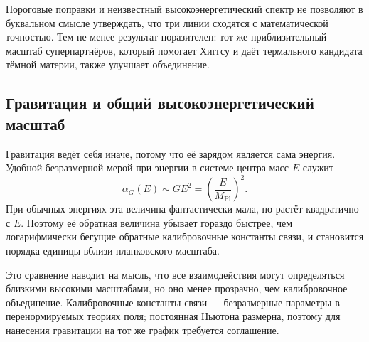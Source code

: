 \begin{classroomqa}
\end{classroomqa}

Пороговые поправки и неизвестный высокоэнергетический спектр не позволяют в буквальном смысле утверждать, что три линии сходятся с математической точностью. Тем не менее результат поразителен: тот же приблизительный масштаб суперпартнёров, который помогает Хиггсу и даёт термального кандидата тёмной материи, также улучшает объединение.

\subsection{Гравитация и общий высокоэнергетический масштаб}

Гравитация ведёт себя иначе, потому что её зарядом является сама энергия. Удобной безразмерной мерой при энергии в системе центра масс \(E\) служит
\begin{equation}
\alpha_G(E)\sim GE^2
=\left(\frac{E}{M_{\mathrm{Pl}}}\right)^2.
\end{equation}
При обычных энергиях эта величина фантастически мала, но растёт квадратично с \(E\). Поэтому её обратная величина убывает гораздо быстрее, чем логарифмически бегущие обратные калибровочные константы связи, и становится порядка единицы вблизи планковского масштаба.

Это сравнение наводит на мысль, что все взаимодействия могут определяться близкими высокими масштабами, но оно менее прозрачно, чем калибровочное объединение. Калибровочные константы связи — безразмерные параметры в перенормируемых теориях поля; постоянная Ньютона размерна, поэтому для нанесения гравитации на тот же график требуется соглашение.

\begin{classroomqa}
\end{classroomqa}


